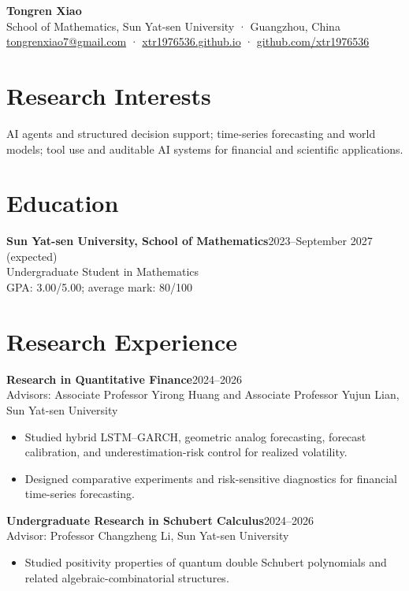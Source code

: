 \documentclass[9pt]{article}
\newcommand{\entry}[2]{\textbf{#1}\hfill #2\\}
\begin{document}
\begin{center}\LARGE\textbf{Tongren Xiao}\\[-2pt]\normalsize
School of Mathematics, Sun Yat-sen University · Guangzhou, China\\
\href{mailto:tongrenxiao7@gmail.com}{tongrenxiao7@gmail.com} · \href{https://xtr1976536.github.io/}{xtr1976536.github.io} · \href{https://github.com/xtr1976536}{github.com/xtr1976536}
\end{center}
\section*{Research Interests}
AI agents and structured decision support; time-series forecasting and world models; tool use and auditable AI systems for financial and scientific applications.
\section*{Education}
\entry{Sun Yat-sen University, School of Mathematics}{2023--September 2027 (expected)}
Undergraduate Student in Mathematics\\
GPA: 3.00/5.00; average mark: 80/100
\section*{Research Experience}
\entry{Research in Quantitative Finance}{2024--2026}
Advisors: Associate Professor Yirong Huang and Associate Professor Yujun Lian, Sun Yat-sen University
\begin{itemize}
\item Studied hybrid LSTM--GARCH, geometric analog forecasting, forecast calibration, and underestimation-risk control for realized volatility.
\item Designed comparative experiments and risk-sensitive diagnostics for financial time-series forecasting.
\end{itemize}
\entry{Undergraduate Research in Schubert Calculus}{2024--2026}
Advisor: Professor Changzheng Li, Sun Yat-sen University
\begin{itemize}\item Studied positivity properties of quantum double Schubert polynomials and related algebraic-combinatorial structures.\end{itemize}
\end{document}

